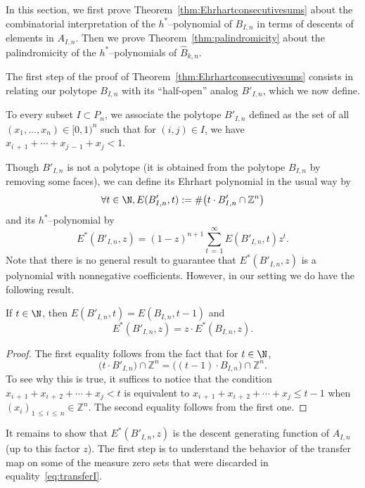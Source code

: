 In this section, we first prove Theorem~\ref{thm:Ehrhartconsecutivesums} about the combinatorial interpretation of the $h^*$--polynomial of $B_{I,n}$ in terms of descents of elements in $A_{I,n}$. Then we prove Theorem~\ref{thm:palindromicity} about the palindromicity of the $h^*$--polynomials of $\hat{B}_{k,n}$.

The first step of the proof of Theorem~\ref{thm:Ehrhartconsecutivesums} consists in relating our polytope $B_{I,n}$ with its ``half-open'' analog $B'_{I,n}$, which we now define.

\begin{defi}
To every subset $I\subset P_n$, we associate the polytope $B'_{I,n}$ defined as the set of all $(x_1,\ldots,x_{n})\in[0,1)^n$ such that for $(i,j)\in I$, we have $x_{i\,+\,1} + \cdots + x_{j\,-\,1} + x_j< 1$.
\end{defi}
Though $B'_{I,n}$ is not a polytope (it is obtained from the polytope $B_{I,n}$ by removing some faces), we can define its Ehrhart polynomial in the usual way by
\[
\forall t\in\N, E(B'_{I,n}, t) := \# \big(t\cdot B'_{I,n} \cap \mathbb{Z}^n \big)
\]
and its $h^*$--polynomial by
\[
E^*(B'_{I,n}, z) = (1-z)^{n+1} \sum_{t\,=\,1}^{\infty} E(B'_{I,n}, t) z^t.
\]
Note that there is no general result to guarantee that $E^*(B'_{I,n}, z)$ is a polynomial with nonnegative coefficients. However, in our setting we do have the following result.

\begin{lemm}
If $t \in \N$, then $E(B'_{I,n}, t) = E(B_{I,n}, t-1)$ and
\begin{equation}\label{eq:halfopenEhrhart}
E^*(B'_{I,n}, z) = z\cdot E^*(B_{I,n}, z).
\end{equation}
\end{lemm}

\begin{proof}
The first equality follows from the fact that for $t \in\N$,
\[
\big(t \cdot B'_{I,n} \big) \cap \mathbb{Z}^n = \big((t-1) \cdot B_{I,n} \big) \cap \mathbb{Z}^n.
\]
To see why this is true, it suffices to notice that the condition $x_{i\,+\,1}+x_{i\,+\,2}+ \cdots + x_{j} < t$ is equivalent to $x_{i\,+\,1}+x_{i\,+\,2} + \cdots + x_{j} \leq t-1$ when $(x_i)_{1\,\leq\,i\,\leq\,n} \in \mathbb{Z}^n$. The second equality follows from the first one.
\end{proof}

It remains to show that $E^*(B'_{I,n}, z)$ is the descent generating function of $A_{I,n}$ (up to this factor $z$). The first step is to understand the behavior of the transfer map on some of the measure zero sets that were discarded in equality~\eqref{eq:transferI}.


